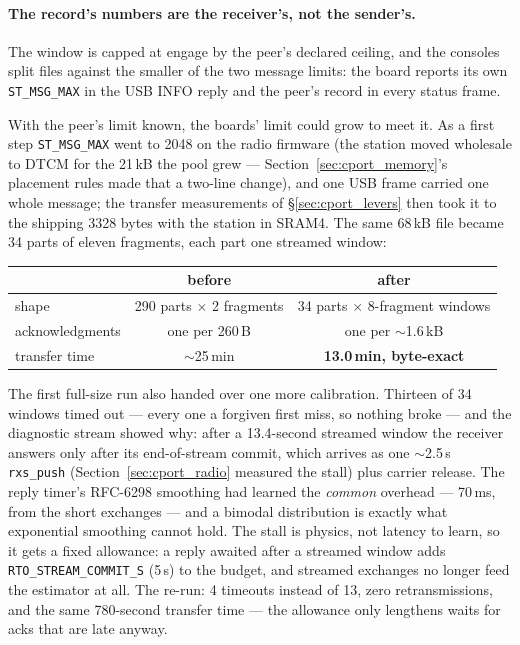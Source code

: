 \paragraph{The record's numbers are the receiver's, not the
sender's.} The window is capped at engage by the peer's declared
ceiling, and the consoles split files against the smaller of the two
message limits: the board reports its own \texttt{ST\_MSG\_MAX} in the
USB INFO reply and the peer's record in every status frame.

With the peer's limit known, the boards' limit could grow to meet it.
As a first step \texttt{ST\_MSG\_MAX} went to 2048 on the radio
firmware (the station moved wholesale to DTCM for the 21\,kB the pool
grew --- Section~\ref{sec:cport_memory}'s placement rules made that a
two-line change), and one USB frame carried one whole message; the
transfer measurements of \S\ref{sec:cport_levers} then took it to
the shipping 3328 bytes with the station in SRAM4. The same
68\,kB file became 34 parts of eleven fragments, each part one
streamed window:

\begin{center}
\begin{tabular}{lcc}
\hline
 & before & after \\
\hline
shape & 290 parts $\times$ 2 fragments & 34 parts $\times$ 8-fragment windows \\
acknowledgments & one per 260\,B & one per $\sim$1.6\,kB \\
transfer time & $\sim$25\,min & \textbf{13.0\,min, byte-exact} \\
\hline
\end{tabular}
\end{center}

The first full-size run also handed over one more calibration. Thirteen
of 34 windows timed out --- every one a forgiven first miss, so nothing
broke --- and the diagnostic stream showed why: after a 13.4-second
streamed window the receiver answers only after its end-of-stream
commit, which arrives as one $\sim$2.5\,s \texttt{rxs\_push}
(Section~\ref{sec:cport_radio} measured the stall) plus carrier
release. The reply timer's RFC-6298 smoothing had learned the
\emph{common} overhead --- 70\,ms, from the short exchanges --- and a
bimodal distribution is exactly what exponential smoothing cannot
hold. The stall is physics, not latency to learn, so it gets a fixed
allowance: a reply awaited after a streamed window adds
\texttt{RTO\_STREAM\_COMMIT\_S} (5\,s) to the budget, and streamed
exchanges no longer feed the estimator at all. The re-run: 4 timeouts
instead of 13, zero retransmissions, and the same 780-second
transfer time --- the allowance only lengthens waits for acks that are
late anyway.

